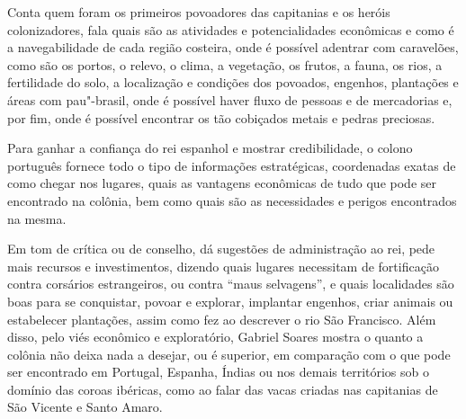 \documentclass[12pt]{extarticle}
\begin{document}
Conta quem foram os primeiros povoadores das capitanias e os heróis colonizadores, fala quais são as atividades e potencialidades econômicas e como é a navegabilidade de cada região costeira, onde é possível adentrar com caravelões, como são os portos, o relevo, o clima, a vegetação, os frutos, a fauna, os rios, a fertilidade do solo, a localização e condições dos povoados, engenhos, plantações e áreas com pau"-brasil, onde é possível haver fluxo de pessoas e de mercadorias e, por fim, onde é possível encontrar os tão cobiçados metais e pedras preciosas.

Para ganhar a confiança do rei espanhol e mostrar credibilidade, o colono português fornece todo o tipo de informações estratégicas, coordenadas exatas de como chegar nos lugares, quais as vantagens econômicas de tudo que pode ser encontrado na colônia, bem como quais são as necessidades e perigos encontrados na mesma.

Em tom de crítica ou de conselho, dá sugestões de administração ao rei, pede mais recursos e investimentos, dizendo quais lugares necessitam de fortificação contra corsários estrangeiros, ou contra ``maus selvagens'', e quais localidades são boas para se conquistar, povoar e explorar, implantar engenhos, criar animais ou estabelecer plantações, assim como fez ao descrever o rio São Francisco.
Além disso, pelo viés econômico e exploratório, Gabriel Soares mostra o quanto a colônia não deixa nada a desejar, ou é superior, em comparação com o que pode ser encontrado em Portugal, Espanha, Índias ou nos demais territórios sob o domínio das coroas ibéricas, como ao falar das vacas criadas nas capitanias de São Vicente e Santo Amaro. 

\end{document}
